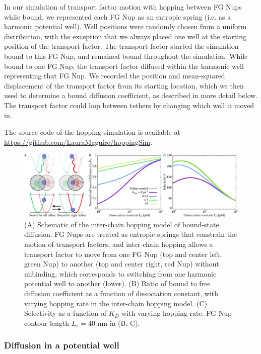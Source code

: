In our simulation of transport factor motion with hopping between FG Nups while bound, we represented each FG Nup as an entropic spring (i.e. as a harmonic potential well).  Well positions were randomly chosen from a uniform distribution, with the exception that we always placed one well at the starting position of the transport factor.  The transport factor started the simulation bound to this FG Nup, and remained bound throughout the simulation.  While bound to one FG Nup, the transport factor diffused within the harmonic well representing that FG Nup. We recorded the position and mean-squared displacement of the transport factor from its starting location, which we then used to determine a bound diffusion coefficient, as described in more detail below.  The transport factor could hop between tethers by changing which well it moved in.

The source code of the hopping simulation is available at \url{https://github.com/LauraMaguire/hoppingSim}.

\begin{figure}
\centering
\includegraphics[width = \textwidth]{figs/ch02/fig4.pdf}
\caption[Selectivity from inter-chain hopping.]{(A) Schematic of the inter-chain hopping model of bound-state diffusion. FG Nups are treated as entropic springs that constrain the motion of transport factors, and inter-chain hopping allows a transport factor to move from one FG Nup (top and center left, green Nup) to another (top and center right, red Nup) without unbinding, which corresponds to switching from one harmonic potential well to another (lower). (B) Ratio of bound to free diffusion coefficient as a function of dissociation constant, with varying hopping rate in the inter-chain hopping model.  (C) Selectivity as a function of $K_D$ with varying hopping rate. FG Nup contour length $L_c = 40$ nm in (B, C). }
\label{fig:hopping}
\end{figure}

\subsubsection{Diffusion in a potential well}

